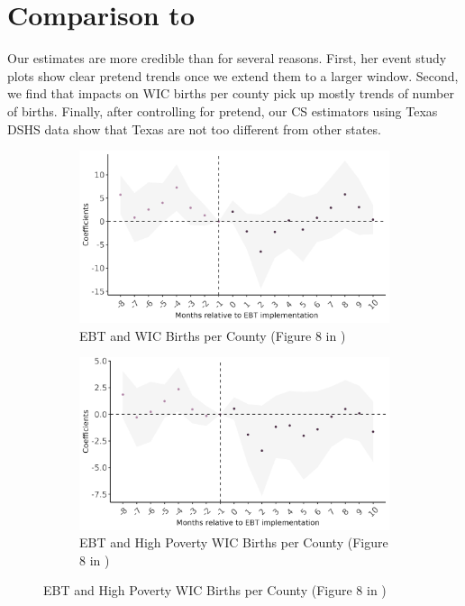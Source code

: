 \section{Comparison to \cite{meckel2020cure}}
Our estimates are more credible than \cite{meckel2020cure} for several reasons. First, her event study plots show clear pretend trends once we extend them to a larger window. Second, we find that impacts on WIC births per county pick up mostly trends of number of births. Finally, after controlling for pretend, our CS estimators using Texas DSHS data show that Texas are not too different from other states.

\begin{figure}[!htbp]
	\begin{subfigure}[t]{.5\textwidth}
		\centering
		\includegraphics[width=\textwidth]{fig8_mk.png}  
		\caption{EBT and WIC Births per County (Figure 8 in \cite{meckel2020cure})}
		\label{mk_es1}
	\end{subfigure}
	\begin{subfigure}[t]{.5\textwidth}
		\centering
		\includegraphics[width=\textwidth]{fig9_mk.png}  
		\caption{EBT and High Poverty WIC Births per County (Figure 8 in \cite{meckel2020cure})}

\end{subfigure}
\end{figure}
